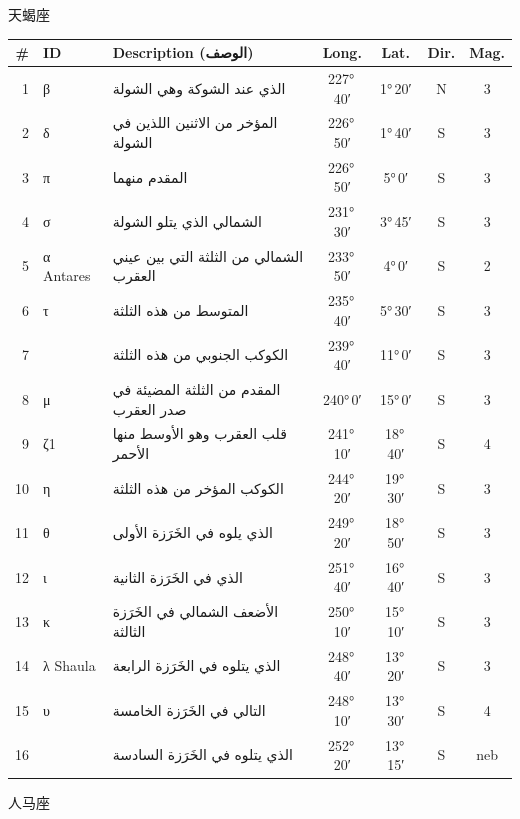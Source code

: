 \documentclass[9pt,a4paper]{extarticle}
\newcommand{\ar}[1]{{\arabicfont\textarabic{#1}}}
\begin{document}
\vspace{4pt}\quad\ar{العقرب}\quad 天蝎座
\begin{longtable}{r l >{\raggedright\arraybackslash}p{6.7cm} c c c c}
\toprule \# & ID & Description (\ar{الوصف}) & Long. & Lat. & Dir. & Mag.\\ \midrule\endhead
1 & β & \ar{الذي عند الشوكة وهي الشولة} & 227°\,40′ & 1°\,20′ & N & 3\\
2 & δ & \ar{المؤخر من الاثنين اللذين في الشولة} & 226°\,50′ & 1°\,40′ & S & 3\\
3 & π & \ar{المقدم منهما} & 226°\,50′ & 5°\,0′ & S & 3\\
4 & σ & \ar{الشمالي الذي يتلو الشولة} & 231°\,30′ & 3°\,45′ & S & 3\\
5 & α Antares & \ar{الشمالي من الثلثة التي بين عيني العقرب} & 233°\,50′ & 4°\,0′ & S & 2\\
6 & τ & \ar{المتوسط من هذه الثلثة} & 235°\,40′ & 5°\,30′ & S & 3\\
7 &  & \ar{الكوكب الجنوبي من هذه الثلثة} & 239°\,40′ & 11°\,0′ & S & 3\\
8 & μ & \ar{المقدم من الثلثة المضيئة في صدر العقرب} & 240°\,0′ & 15°\,0′ & S & 3\\
9 & ζ1 & \ar{قلب العقرب وهو الأوسط منها الأحمر} & 241°\,10′ & 18°\,40′ & S & 4\\
10 & η & \ar{الكوكب المؤخر من هذه الثلثة} & 244°\,20′ & 19°\,30′ & S & 3\\
11 & θ & \ar{الذي يلوه في الخَرَزة الأولى} & 249°\,20′ & 18°\,50′ & S & 3\\
12 & ι & \ar{الذي في الخَرَزة الثانية} & 251°\,40′ & 16°\,40′ & S & 3\\
13 & κ & \ar{الأضعف الشمالي في الخَرَزة الثالثة} & 250°\,10′ & 15°\,10′ & S & 3\\
14 & λ Shaula & \ar{الذي يتلوه في الخَرَزة الرابعة} & 248°\,40′ & 13°\,20′ & S & 3\\
15 & υ & \ar{التالي في الخَرَزة الخامسة} & 248°\,10′ & 13°\,30′ & S & 4\\
16 &  & \ar{الذي يتلوه في الخَرَزة السادسة} & 252°\,20′ & 13°\,15′ & S & neb\\
\bottomrule\end{longtable}
\vspace{4pt}\quad\ar{القوس}\quad 人马座
\end{document}
